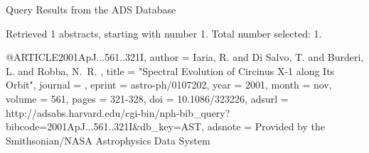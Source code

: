 Query Results from the ADS Database


Retrieved 1 abstracts, starting with number 1.  Total number selected: 1.

@ARTICLE{2001ApJ...561..321I,
   author = {{Iaria}, R. and {Di Salvo}, T. and {Burderi}, L. and {Robba}, N.~R.
	},
    title = "{Spectral Evolution of Circinus X-1 along Its Orbit}",
  journal = {\apj},
   eprint = {astro-ph/0107202},
     year = 2001,
    month = nov,
   volume = 561,
    pages = {321-328},
      doi = {10.1086/323226},
   adsurl = {http://adsabs.harvard.edu/cgi-bin/nph-bib_query?bibcode=2001ApJ...561..321I&db_key=AST},
  adsnote = {Provided by the Smithsonian/NASA Astrophysics Data System}
}



